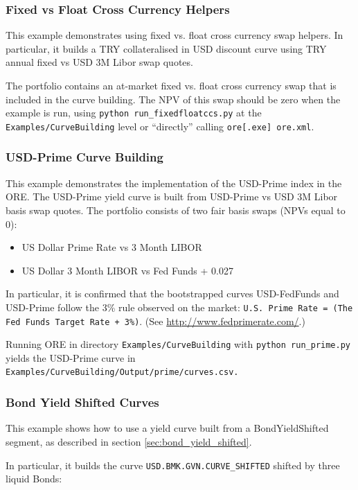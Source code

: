 \subsubsection{Fixed vs Float Cross Currency Helpers}

This example demonstrates using fixed vs. float 
cross currency swap helpers. In particular, it builds a TRY collateralised in USD 
discount curve using TRY annual fixed vs USD 3M Libor swap quotes.

The portfolio contains an at-market fixed vs. float cross currency swap that is 
included in the curve building. The NPV of this swap should be zero when the example is run,
using {\tt python run\_fixedfloatccs.py} at the {\tt Examples/CurveBuilding} level or
``directly'' calling {\tt ore[.exe] ore.xml}.

\subsubsection{USD-Prime Curve Building}

This example demonstrates the implementation of the USD-Prime index in the ORE.
The USD-Prime yield curve is built from USD-Prime vs USD 3M Libor basis swap quotes.
The portfolio consists of two fair basis swaps (NPVs equal to 0):
\begin{itemize}
\item US Dollar Prime Rate vs 3 Month LIBOR
\item US Dollar 3 Month LIBOR vs Fed Funds + 0.027
\end{itemize}

In particular, it is confirmed that the bootstrapped curves USD-FedFunds and USD-Prime follow
the 3\% rule observed on the market: {\tt U.S. Prime Rate = (The Fed Funds Target Rate + 3\%)}.
(See \url{http://www.fedprimerate.com/}.)

Running ORE in directory {\tt Examples/CurveBuilding} with {\tt python run\_prime.py }
yields the USD-Prime curve in {\tt Examples/CurveBuilding/Output/prime/curves.csv.}

\subsubsection{Bond Yield Shifted Curves}

This example shows how to use a yield curve
built from a BondYieldShifted segment, as described in section \ref{sec:bond_yield_shifted}.

In particular, it builds the curve {\tt USD.BMK.GVN.CURVE\_SHIFTED} shifted by three liquid Bonds:


